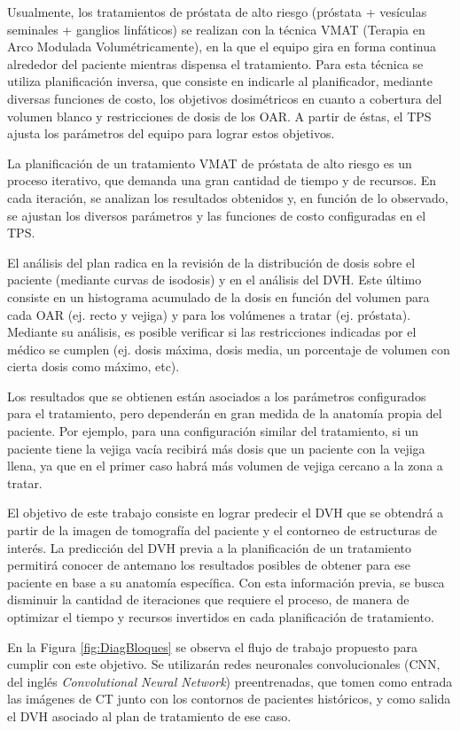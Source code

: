 \documentclass[
11pt, %
codirector, %
]{charter}
\begin{document}
Usualmente, los tratamientos de próstata de alto riesgo (próstata + vesículas seminales + ganglios linfáticos) se realizan con la técnica VMAT (Terapia en Arco Modulada Volumétricamente), en la que el equipo gira en forma continua alrededor del paciente mientras dispensa el tratamiento. Para esta técnica se utiliza planificación inversa, que consiste en indicarle al planificador, mediante diversas funciones de costo, los objetivos dosimétricos en cuanto a cobertura del volumen blanco y restricciones de dosis de los OAR. A partir de éstas, el TPS ajusta los parámetros del equipo para lograr estos objetivos.

La planificación de un tratamiento VMAT de próstata de alto riesgo es un proceso iterativo, que demanda una gran cantidad de tiempo y de recursos. En cada iteración, se analizan los resultados obtenidos y, en función de lo observado, se ajustan los diversos parámetros y las funciones de costo configuradas en el TPS. 

El análisis del plan radica en la revisión de la distribución de dosis sobre el paciente (mediante curvas de isodosis) y en el análisis del DVH. Este último consiste en un histograma acumulado de la dosis en función del volumen para cada OAR (ej. recto y vejiga) y para los volúmenes a tratar (ej. próstata). Mediante su análisis, es posible verificar si las restricciones indicadas por el médico se cumplen (ej. dosis máxima, dosis media, un porcentaje de volumen con cierta dosis como máximo, etc). 

Los resultados que se obtienen están asociados a los parámetros configurados para el tratamiento, pero dependerán en gran medida de la anatomía propia del paciente. Por ejemplo, para una configuración similar del tratamiento, si un paciente tiene la vejiga vacía recibirá más dosis que un paciente con la vejiga llena, ya que en el primer caso habrá más volumen de vejiga cercano a la zona a tratar.

El objetivo de este trabajo consiste en lograr predecir el DVH que se obtendrá a partir de la imagen de tomografía del paciente y el contorneo de estructuras de interés. La predicción del DVH previa a la planificación de un tratamiento permitirá conocer de antemano los resultados posibles de obtener para ese paciente en base a su anatomía específica. Con esta información previa, se busca disminuir la cantidad de iteraciones que requiere el proceso, de manera de optimizar el tiempo y recursos invertidos en cada planificación de tratamiento. 

En la Figura \ref{fig:DiagBloques} se observa el flujo de trabajo propuesto para cumplir con este objetivo. Se utilizarán redes neuronales convolucionales (CNN, del inglés \textit{Convolutional Neural Network}) preentrenadas, que tomen como entrada las imágenes de CT junto con los contornos de pacientes históricos, y como salida el DVH asociado al plan de tratamiento de ese caso. 
\end{document}
